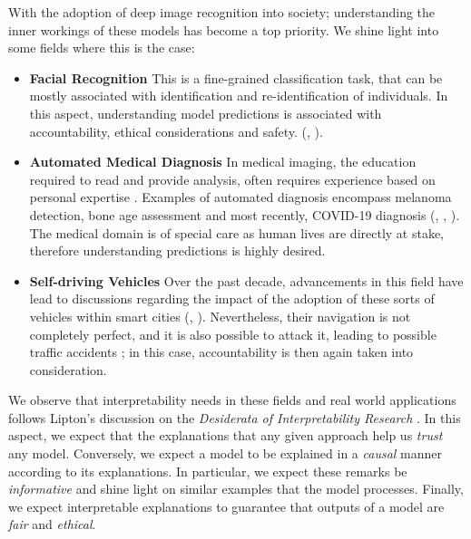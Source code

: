 \noindent With the adoption of deep image recognition into society; understanding the 
inner workings of these models has become a top priority. We shine light into some fields where 
this is the case:
\begin{itemize}
    \item \textbf{Facial Recognition} This  is a fine-grained classification task, 
    that can be mostly associated with identification and re-identification of individuals. 
    In this aspect, understanding model predictions is associated with accountability, ethical 
    considerations and safety.
    (\cite{selinger2020inconsentability}, \cite{andrejevic2020facial}).
    \item \textbf{Automated Medical Diagnosis} In medical imaging, the education 
    required to read and provide analysis, often requires experience based 
    on personal expertise \autocite{nakashima2013visual}. Examples of automated diagnosis encompass 
    melanoma detection, bone age assessment and most recently, COVID-19 diagnosis 
    (\cite{yu2016automated}, \cite{BoNet2019hand}, \cite{huang2021artificial}). The medical domain 
    is of special care as human lives are directly at stake, therefore understanding predictions is 
    highly desired.
    \item \textbf{Self-driving Vehicles} Over the past decade, advancements in this field have lead to 
    discussions regarding the impact of the adoption of these sorts of  vehicles within smart cities  
    (\cite{duarte2018impact}, \cite{millard2018pedestrians}). Nevertheless, their 
    navigation is not completely perfect, and it is also possible to attack it, leading to possible 
    traffic accidents \autocite{dixit2016autonomous}; in this case, accountability is then again 
    taken into consideration.
\end{itemize}
 
\noindent We observe that interpretability needs in these fields and real world applications follows 
Lipton's discussion on the \textit{Desiderata of Interpretability Research} 
\autocite{mythos_interp}. In this aspect, we expect that the explanations that any given 
approach help us \emph{trust} any model. Conversely, we expect a model to be explained in a 
\emph{causal} manner according to its explanations. In particular, 
we expect these remarks be \emph{informative} and shine light on similar examples that the 
model processes. Finally, we expect interpretable explanations to guarantee that outputs 
of a model are \emph{fair} and \emph{ethical}.\\

